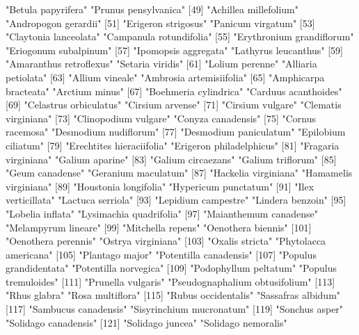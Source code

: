 \documentclass{article}
\begin{document}
\begin{Schunk}
\begin{Soutput}
 [47] "Betula papyrifera"             "Prunus pensylvanica"          
 [49] "Achillea millefolium"          "Andropogon gerardii"          
 [51] "Erigeron strigosus"            "Panicum virgatum"             
 [53] "Claytonia lanceolata"          "Campanula rotundifolia"       
 [55] "Erythronium grandiflorum"      "Eriogonum subalpinum"         
 [57] "Ipomopsis aggregata"           "Lathyrus leucanthus"          
 [59] "Amaranthus retroflexus"        "Setaria viridis"              
 [61] "Lolium perenne"                "Alliaria petiolata"           
 [63] "Allium vineale"                "Ambrosia artemisiifolia"      
 [65] "Amphicarpa bracteata"          "Arctium minus"                
 [67] "Boehmeria cylindrica"          "Carduus acanthoides"          
 [69] "Celastrus orbiculatus"         "Cirsium arvense"              
 [71] "Cirsium vulgare"               "Clematis virginiana"          
 [73] "Clinopodium vulgare"           "Conyza canadensis"            
 [75] "Cornus racemosa"               "Desmodium nudiflorum"         
 [77] "Desmodium paniculatum"         "Epilobium ciliatum"           
 [79] "Erechtites hieraciifolia"      "Erigeron philadelphicus"      
 [81] "Fragaria virginiana"           "Galium aparine"               
 [83] "Galium circaezans"             "Galium triflorum"             
 [85] "Geum canadense"                "Geranium maculatum"           
 [87] "Hackelia virginiana"           "Hamamelis virginiana"         
 [89] "Houstonia longifolia"          "Hypericum punctatum"          
 [91] "Ilex verticillata"             "Lactuca serriola"             
 [93] "Lepidium campestre"            "Lindera benzoin"              
 [95] "Lobelia inflata"               "Lysimachia quadrifolia"       
 [97] "Maianthemum canadense"         "Melampyrum lineare"           
 [99] "Mitchella repens"              "Oenothera biennis"            
[101] "Oenothera perennis"            "Ostrya virginiana"            
[103] "Oxalis stricta"                "Phytolacca americana"         
[105] "Plantago major"                "Potentilla canadensis"        
[107] "Populus grandidentata"         "Potentilla norvegica"         
[109] "Podophyllum peltatum"          "Populus tremuloides"          
[111] "Prunella vulgaris"             "Pseudognaphalium obtusifolium"
[113] "Rhus glabra"                   "Rosa multiflora"              
[115] "Rubus occidentalis"            "Sassafras albidum"            
[117] "Sambucus canadensis"           "Sisyrinchium mucronatum"      
[119] "Sonchus asper"                 "Solidago canadensis"          
[121] "Solidago juncea"               "Solidago nemoralis"           

\end{Soutput}
\end{Schunk}
\end{document}
